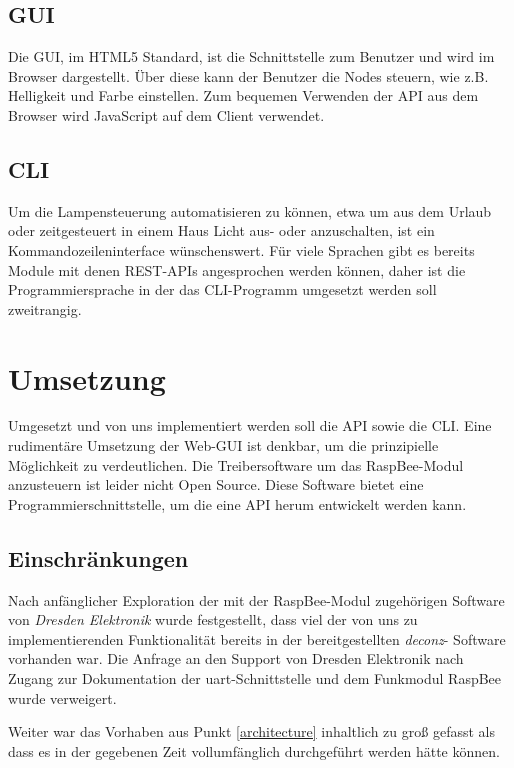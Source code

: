 \documentclass[a4paper,12pt]{article}
\begin{document}
\subsection{GUI}

Die GUI, im HTML5 Standard, ist die Schnittstelle zum Benutzer und wird im Browser dargestellt.
Über diese kann der Benutzer die Nodes steuern, wie z.B. Helligkeit und Farbe einstellen.
Zum bequemen Verwenden der API aus dem Browser wird JavaScript auf dem Client verwendet. 

\subsection{CLI}

Um die Lampensteuerung automatisieren zu können, etwa um aus dem Urlaub oder
zeitgesteuert in einem Haus Licht aus- oder anzuschalten, ist ein
Kommandozeileninterface wünschenswert. Für viele Sprachen gibt es bereits
Module mit denen REST-APIs angesprochen werden können, daher ist die
Programmiersprache in der das CLI-Programm umgesetzt werden soll zweitrangig.

\newpage

\section{Umsetzung}
\label{doing}

Umgesetzt und von uns implementiert werden soll die API sowie die CLI. Eine
rudimentäre Umsetzung der Web-GUI ist denkbar, um die prinzipielle Möglichkeit zu
verdeutlichen.
Die Treibersoftware um das RaspBee-Modul anzusteuern ist leider nicht
Open Source. Diese Software bietet eine Programmierschnittstelle, um die eine API
herum entwickelt werden kann.

\subsection{Einschränkungen}

Nach anfänglicher Exploration der mit der RaspBee-Modul zugehörigen Software
von \emph{Dresden Elektronik} wurde festgestellt, dass viel der von uns zu
implementierenden Funktionalität bereits in der bereitgestellten \emph{\acrshort{deconz}}-
Software vorhanden war. Die Anfrage an den Support von Dresden Elektronik
nach Zugang zur Dokumentation der \acrshort{uart}-Schnittstelle und dem Funkmodul
RaspBee wurde verweigert.

Weiter war das Vorhaben aus Punkt \ref{architecture} inhaltlich zu groß gefasst
als dass es in der gegebenen Zeit vollumfänglich durchgeführt werden hätte können.
\end{document}
